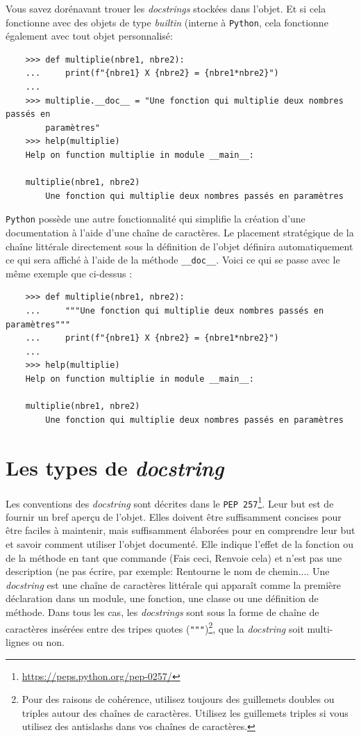 \documentclass[a4paper,12pt]{book}
\begin{document}
Vous savez dorénavant trouer les \textit{docstrings} stockées dans l'objet. Et si cela fonctionne avec des objets de type \textit{builtin} (interne à \texttt{Python}, cela fonctionne également avec tout objet personnalisé:
\begin{verbatim}
    >>> def multiplie(nbre1, nbre2):
    ...     print(f"{nbre1} X {nbre2} = {nbre1*nbre2}")
    ...
    >>> multiplie.__doc__ = "Une fonction qui multiplie deux nombres passés en 
        paramètres"
    >>> help(multiplie)
    Help on function multiplie in module __main__:

    multiplie(nbre1, nbre2)
        Une fonction qui multiplie deux nombres passés en paramètres 
\end{verbatim}
\medskip

\texttt{Python} possède une autre fonctionnalité qui simplifie la création d'une documentation à l'aide d'une chaîne de caractères. Le placement stratégique de la chaîne littérale directement sous la définition de l'objet définira automatiquement ce qui sera affiché à l'aide de la méthode \texttt{\_\_doc\_\_}. Voici ce qui se passe avec le même exemple que ci-dessus :
\begin{verbatim}
    >>> def multiplie(nbre1, nbre2):
    ...     """Une fonction qui multiplie deux nombres passés en paramètres"""
    ...     print(f"{nbre1} X {nbre2} = {nbre1*nbre2}")
    ... 
    >>> help(multiplie)
    Help on function multiplie in module __main__:

    multiplie(nbre1, nbre2)
        Une fonction qui multiplie deux nombres passés en paramètres 
\end{verbatim}
\medskip

\section{Les types de \textit{docstring}}
Les conventions des \textit{docstring} sont décrites dans le \texttt{PEP 257}\footnote{\url{https://peps.python.org/pep-0257/}}. Leur but est de fournir un bref aperçu de l'objet. Elles doivent être suffisamment concises pour être faciles à maintenir, mais suffisamment élaborées pour en comprendre leur but et savoir comment utiliser l'objet documenté. Elle indique l'effet de la fonction ou de la méthode en tant que commande (\og Fais ceci\fg{}, \og Renvoie cela\fg{}) et n'est pas une description (ne pas écrire, par exemple: \og Rentourne le nom de chemin...\fg{}. Une \textit{docstring} est une chaîne de caractères littérale qui apparaît comme la première déclaration dans un module, une fonction, une classe ou une définition de méthode. Dans tous les cas, les \textit{docstrings} sont sous la forme de chaîne de caractères insérées entre des tripes quotes (\texttt{"""})\footnote{Pour des raisons de cohérence, utilisez toujours des guillemets doubles ou triples autour des chaînes de caractères. Utilisez les guillemets triples si vous utilisez des antislashs dans vos chaînes de caractères.}, que la \textit{docstring} soit multi-lignes ou non. 
\medskip
\end{document}
